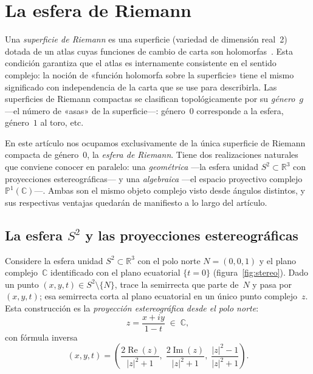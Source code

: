 \documentclass[11pt,a4paper]{article}
\theoremstyle{plain}
\theoremstyle{definition}
\theoremstyle{remark}
\newcommand{\C}{\mathbb{C}}
\newcommand{\R}{\mathbb{R}}
\newcommand{\Puno}{\mathbb{P}^1(\mathbb{C})}
\begin{document}
\section{La esfera de Riemann}
\label{sec:esfera}

Una \emph{superficie de Riemann} es una superficie (variedad de dimensión
real~2) dotada de un atlas cuyas funciones de cambio de carta son
holomorfas~\cite{Jones1987,Miranda1995}.
Esta condición garantiza que el atlas es internamente consistente en el
sentido complejo: la noción de «función holomorfa sobre la superficie»
tiene el mismo significado con independencia de la carta que se use
para describirla.
Las superficies de Riemann compactas se clasifican topológicamente por su
\emph{género}~$g$ —el número de «asas» de la superficie—: género~$0$
corresponde a la esfera, género~$1$ al toro, etc.

En este artículo nos ocupamos exclusivamente de la única superficie de
Riemann compacta de género~$0$, la \emph{esfera de Riemann}.
Tiene dos realizaciones naturales que conviene conocer en paralelo: una
\emph{geométrica} —la esfera unidad $S^2\subset\R^3$ con proyecciones
estereográficas— y una \emph{algebraica} —el espacio proyectivo complejo
$\Puno$—.
Ambas son el mismo objeto complejo visto desde ángulos distintos, y sus
respectivas ventajas quedarán de manifiesto a lo largo del artículo.

\subsection{La esfera \texorpdfstring{$S^2$}{S2} y las proyecciones estereográficas}

Considere la esfera unidad $S^2\subset\R^3$ con el polo norte $N=(0,0,1)$
y el plano complejo~$\C$ identificado con el plano ecuatorial $\{t=0\}$
(figura~\ref{fig:stereo}).
Dado un punto $(x,y,t)\in S^2\setminus\{N\}$,
trace la semirrecta que parte de~$N$ y pasa por $(x,y,t)$; esa semirrecta
corta al plano ecuatorial en un único punto complejo~$z$.
Esta construcción es la \emph{proyección estereográfica desde el polo norte}:
\[
  z = \frac{x+iy}{1-t}\;\in\;\C,
\]
con fórmula inversa
\[
   (x,y,t) = \left(\frac{2\operatorname{Re}(z)}{|z|^2+1},\;
                    \frac{2\operatorname{Im}(z)}{|z|^2+1},\;
                    \frac{|z|^2-1}{|z|^2+1}\right).
\]
\end{document}
